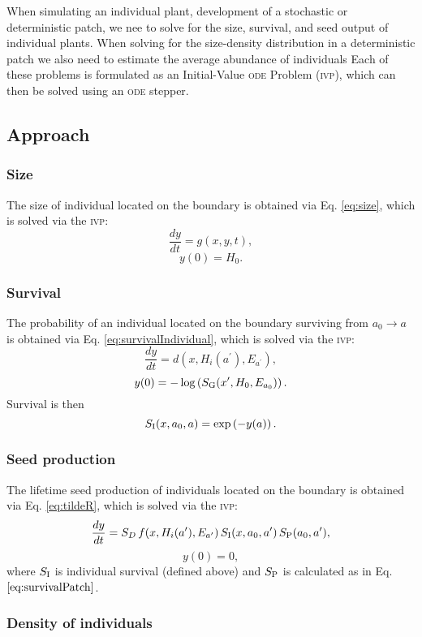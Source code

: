 \documentclass[10pt,twoside]{article}
\begin{document}
When simulating an individual plant, development of a stochastic or
deterministic patch, we nee to solve for the size, survival, and seed
output of individual plants. When solving for the size-density distribution
in a deterministic patch we also need to estimate the average abundance of individuals
Each of these problems is formulated as an Initial-Value \textsc{ode} Problem
(\textsc{ivp}), which can then be solved using an \textsc{ode} stepper.

\subsection{Approach}

\subsubsection{Size}\label{size}

The size of individual located on the boundary is obtained via Eq.
\ref{eq:size}, which is solved via the \textsc{ivp}:
\[\frac{dy}{dt} = g(x, y, t) ,\] \[ y(0) = H_0.\]

\subsubsection{Survival}\label{survival}

The probability of an individual located on the boundary surviving from
\(a_0 \rightarrow a\) is obtained via Eq. \ref{eq:survivalIndividual},
which is solved via the \textsc{ivp}:
\[\frac{dy}{dt} = d(x, H_i(a^\prime) , E_{a^\prime}),\]
\[ y(0) = - \log\left(S_{\rm G} (x^\prime, H_0, E_{a_0})\right) .\]
Survival is then \[ S_{\rm I} (x, a_0, a) = \exp\left( - y(a) \right).\]

\subsubsection{Seed production}\label{seed-production}

The lifetime seed production of individuals located on the boundary is
obtained via Eq. \ref{eq:tildeR}, which is solved via the \textsc{ivp}:
\[\frac{dy}{dt} = S_D \, f(x, H_i(a^\prime), E_{a^\prime}) \, S_{\rm I} (x, a_0, a^\prime) \, S_{\rm P} (a_0, a^\prime),\]
\[ y(0) = 0,\] where \(S_{\rm I}\) is individual survival (defined
above) and \(S_{\rm P}\) is calculated as in Eq.
\(\ref{eq:survivalPatch}\).

\subsubsection{Density of individuals}\label{density-of-individuals}
\end{document}
